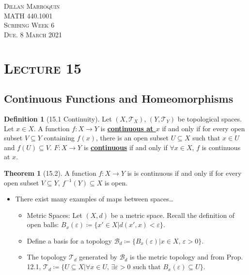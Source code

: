 \documentclass{article}
\newcommand{\B}{\ensuremath{\mathcal{B}}}
\newcommand{\Iff}{if and only if}
\newcommand{\coleq}{\ensuremath{\coloneqq}}
\newcommand{\define}[1]{\textbf{\underline{#1}}}
\newcommand{\func}[3]{\ensuremath{#1: #2 \to #3}}
\newcommand{\ball}[3]{\ensuremath{B_{#1}^{#2}(#3)}}
\newcommand{\tp}{\ensuremath{\mathcal{T}}}
\newcommand{\Ts}[2]{\ensuremath{(#1,#2)}}
\renewcommand{\Subset}{\subseteq}
\theoremstyle{definition}
\newtheorem*{defn}{Definition}
\newtheorem*{thm}{Theorem}
\theoremstyle{remark}
\begin{document}
    \begin{center}
        \textsc{Dillan Marroquin\\MATH 440.1001\\Scribing Week 6\\Due. 8 March 2021\\}
    \end{center}
        
    \noindent\section*{\textbf{\textsc{Lecture 15}}}{
        \subsection*{Continuous Functions and Homeomorphisms}
            \begin{defn}[15.1 Continuity]
            Let $\Ts{X}{\tp_X}, \, \Ts{Y}{\tp_Y}$ be topological spaces. Let $x \in X$. A function $\func{f}{X}{Y}$ is \define{continuous at $x$} \Iff{} for every open subset $V \Subset Y$ containing $f(x)$, there is an open subset $U \Subset X$ such that $x\in U$ and $f(U) \Subset V$. $\func{F}{X}{Y}$ is \define{continuous} \Iff{} $\forall x \in X$, $f$ is continuous at $x$.
        \end{defn}
        
        \begin{thm}[15.2]
            A function $\func{f}{X}{Y}$ is is continuous \Iff{} for every open subset $V \Subset Y$, $f^{-1}(Y) \Subset X$ is open.
        \end{thm}
        
        \begin{itemize}
            \item There exist many examples of maps between spaces\ldots
            \begin{itemize}
                \item Metric Spaces: Let $(X,d)$ be a metric space. Recall the definition of open balls: $\ball{x}{}{\varepsilon}\coleq \{x'\in X|d(x',x)<\varepsilon\}$.
                \item Define a basis for a topology $\B_d\coleq\{\ball{x}{}{\varepsilon}|x\in X, \, \varepsilon>0\}$.
                \item The topology $\tp_d$ generated by $\B_d$ is the metric topology and from Prop. 12.1, $\tp_d\coleq\{U \Subset X| \forall x\in U, \, \exists\varepsilon>0 \text{ such that }\ball{x}{}{\varepsilon} \Subset U\}$.
            \end{itemize}
        \end{itemize}
        
}
\end{document}
